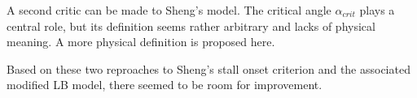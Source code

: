 A second critic can be made to Sheng's model. The critical angle $\alpha_{crit}$ plays a central role, but its definition seems rather arbitrary and lacks of physical meaning. A more physical definition is proposed here. 

Based on these two reproaches to Sheng's stall onset criterion and the associated modified LB model, there seemed to be room for improvement.


 



